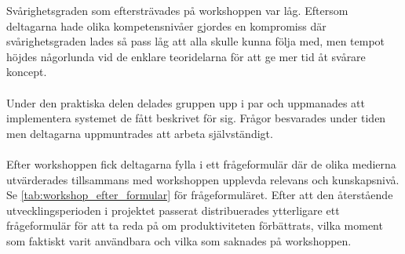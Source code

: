 Svårighetsgraden som eftersträvades på workshoppen var låg. Eftersom deltagarna hade olika
kompetensnivåer gjordes en kompromiss där svårighetsgraden lades så pass låg att alla skulle kunna
följa med, men tempot höjdes någorlunda vid de enklare teoridelarna för att ge mer
tid åt svårare koncept.
\\ \\
Under den praktiska delen delades gruppen upp i par och uppmanades att implementera systemet de fått
beskrivet för sig. Frågor besvarades under tiden men deltagarna uppmuntrades att arbeta självständigt.
\\ \\
Efter workshoppen fick deltagarna fylla i ett frågeformulär där de olika
medierna utvärderades tillsammans med workshoppen upplevda relevans och kunskapsnivå.
Se \ref{tab:workshop_efter_formular} för frågeformuläret. Efter att den återstående
utvecklingsperioden i projektet passerat distribuerades ytterligare ett frågeformulär
för att ta reda på om produktiviteten förbättrats, vilka moment som faktiskt varit
användbara och vilka som saknades på workshoppen.

